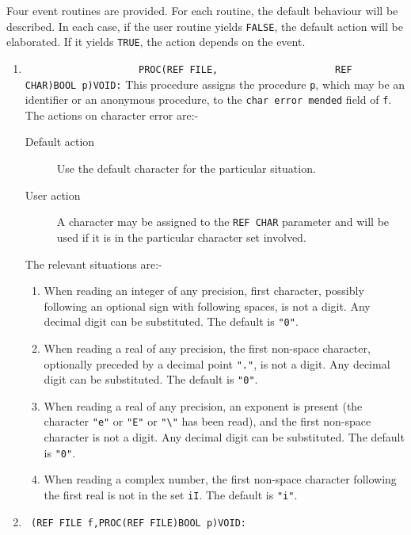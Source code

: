 Four event routines are provided. For each routine, the default
behaviour will be described. In each case, if the user routine yields
\verb|FALSE|, the default action will be elaborated. If it yields
\verb|TRUE|, the action depends on the event.
\begin{enumerate}
\item {}\newline
\verb|                    PROC(REF FILE,|\newline
\verb|                    REF CHAR)BOOL p)VOID:|\newline
This procedure assigns the procedure \verb|p|, which may be an
identifier or an anonymous procedure, to the \texttt{char error mended}
field of \verb|f|. The actions on character error are:-
\begin{description}
\item[Default action] Use the default character for the particular
situation.
\item[User action] A character may be assigned to the \texttt{REF
CHAR} parameter and will be used if it is in the particular character
set involved.
\end{description}
The relevant situations are:-
\begin{enumerate}
\item When reading an integer of any precision, first character,
possibly following an optional sign with following spaces, is not a
digit. Any decimal digit can be substituted. The default is \verb|"0"|.
\item When reading a real of any precision, the first non-space
character, optionally preceded by a decimal point \verb|"."|, is not a
digit. Any decimal digit can be substituted. The default is \verb|"0"|.
\item When reading a real of any precision, an exponent is present
(the character \verb|"e"| or \verb|"E"| or \verb|"\"| has been read),
and the first non-space character is not a digit. Any decimal digit
can be substituted. The default is \verb|"0"|.
\item When reading a complex number, the first non-space character
following the first real is not in the set \verb|iI|. The default is
\verb|"i"|.
\end{enumerate}
\item {}\newline
\verb| (REF FILE f,PROC(REF FILE)BOOL p)VOID:|\newline

\end{enumerate}
